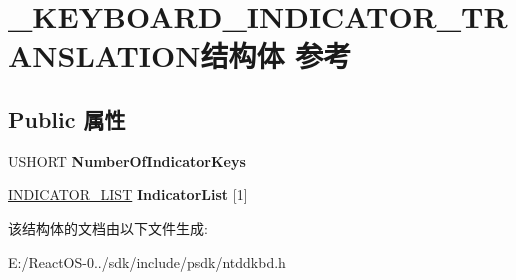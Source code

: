 \hypertarget{struct___k_e_y_b_o_a_r_d___i_n_d_i_c_a_t_o_r___t_r_a_n_s_l_a_t_i_o_n}{}\section{\+\_\+\+K\+E\+Y\+B\+O\+A\+R\+D\+\_\+\+I\+N\+D\+I\+C\+A\+T\+O\+R\+\_\+\+T\+R\+A\+N\+S\+L\+A\+T\+I\+O\+N结构体 参考}
\label{struct___k_e_y_b_o_a_r_d___i_n_d_i_c_a_t_o_r___t_r_a_n_s_l_a_t_i_o_n}
\subsection*{Public 属性}
\begin{DoxyCompactItemize}
\item 
\mbox{\label{struct___k_e_y_b_o_a_r_d___i_n_d_i_c_a_t_o_r___t_r_a_n_s_l_a_t_i_o_n_a2e11370d1d546f72f9d20ebc914cac9e}} 
U\+S\+H\+O\+RT {\bfseries Number\+Of\+Indicator\+Keys}
\item 
\mbox{\label{struct___k_e_y_b_o_a_r_d___i_n_d_i_c_a_t_o_r___t_r_a_n_s_l_a_t_i_o_n_a27dc52cf5d99cce597a87ae51870aa9b}} 
\hyperlink{struct___i_n_d_i_c_a_t_o_r___l_i_s_t}{I\+N\+D\+I\+C\+A\+T\+O\+R\+\_\+\+L\+I\+ST} {\bfseries Indicator\+List} \mbox{[}1\mbox{]}
\end{DoxyCompactItemize}


该结构体的文档由以下文件生成\+:\begin{DoxyCompactItemize}
\item 
E\+:/\+React\+O\+S-\/0../sdk/include/psdk/ntddkbd.\+h\end{DoxyCompactItemize}
